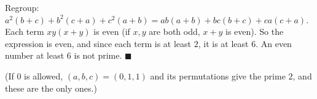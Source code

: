 Regroup: $a^2(b+c)+b^2(c+a)+c^2(a+b)=ab(a+b)+bc(b+c)+ca(c+a)$. Each term $xy(x+y)$ is even (if $x,y$ are both odd, $x+y$ is even). So the expression is even, and since each term is at least $2$, it is at least $6$. An even number at least $6$ is not prime. $\blacksquare$

(If $0$ is allowed, $(a,b,c)=(0,1,1)$ and its permutations give the prime $2$, and these are the only ones.)

